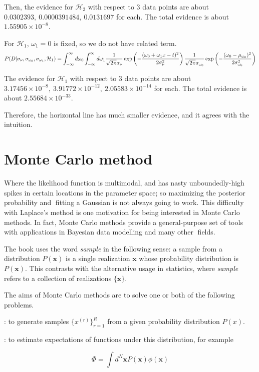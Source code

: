 \documentclass[a4paper,11pt]{article}
\newcommand{\vect}[1]{\boldsymbol{\mathbf{#1}}}
\numberwithin{equation}{section}
\begin{document}
{Then, the evidence for $\mathcal{H}_2$ with respect to 3 data points are about $0.0302393, ~0.0000391484, ~0.0131697$ for each. The total evidence is about $1.55905 \times 10^{-8}$.



For $\mathcal{H}_1$, $\omega_1 =0$ is fixed, so we do not have related term. 
{\small $$
P(D|\sigma_{\nu}, \sigma_{\omega_0},\sigma_{\omega_1},\mathcal{H}_1) = \int^{\infty}_{-\infty} d\omega_0 \int^{\infty}_{-\infty} d\omega_1 
{1\over \sqrt{2\pi }\sigma_{\nu}} 
\exp\left(-{(\omega_0+\omega_1 x - t)^2\over 2\sigma^2_{\nu}}\right){1\over \sqrt{2\pi }\sigma_{\omega_0}} 
\exp\left(-{(\omega_0-\mu_{\omega_0})^2\over 2\sigma^2_{{\omega_0}}}\right)
$$ }

The evidence for $\mathcal{H}_1$ with respect to 3 data points are about $3.17456 \times 10^{-8},~3.91772 \times 10^{-12},~2.05583 \times 10^{-14}$ for each. The total evidence is about $2.55684 \times 10^{-33}$.

Therefore, the horizontal line has much smaller evidence, and it agrees with the intuition. 


\section{Monte Carlo method}
Where the likelihood function
is multimodal, and has nasty unboundedly-high spikes in certain locations in
the parameter space; so maximizing the posterior probability and fitting a
Gaussian is not always going to work. This difficulty with Laplace's method is
one motivation for being interested in Monte Carlo methods. In fact, Monte
Carlo methods provide a general-purpose set of tools with applications in
Bayesian data modelling and many other fields.

The book uses the word {\it sample} in the following sense: a sample
from a distribution $P(\vect x)$ is a single realization $\vect x$ whose probability distribution
is $P(\vect x)$. This contrasts with the alternative usage in statistics, where {\it sample}
refers to a collection of realizations $\{\vect x\}$.

The aims of Monte Carlo methods are to solve one or both of the
following problems.

\vect{Problem 1}: to generate samples $\{x^{(r)}\}^R_{r=1}$ from a given probability distribution
$P(x)$.

\vect{Problem 2}: to estimate expectations of functions under this distribution, for
example

$$
\Phi = \int d^N \vect x P(\vect x) \phi(\vect x)
$$

}
\end{document}
